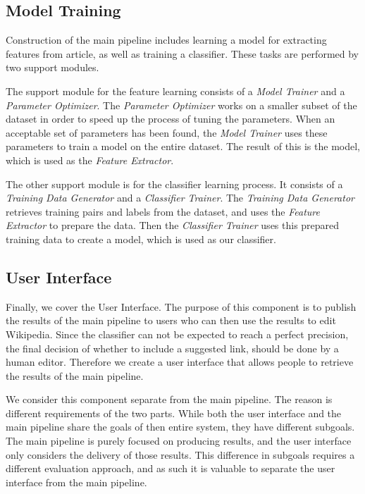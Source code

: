 \subsection{Model Training}
Construction of the main pipeline includes learning a model for extracting features from article, as well as training a classifier. These tasks are performed by two support modules.

The support module for the feature learning consists of a \emph{Model Trainer} and a \emph{Parameter Optimizer}. The \emph{Parameter Optimizer} works on a smaller subset of the dataset in order to speed up the process of tuning the parameters. When an acceptable set of parameters has been found, the \emph{Model Trainer} uses these parameters to train a model on the entire dataset. The result of this is the model, which is used as the \emph{Feature Extractor}.

The other support module is for the classifier learning process. It consists of a \emph{Training Data Generator} and a \emph{Classifier Trainer}. The \emph{Training Data Generator} retrieves training pairs and labels from the dataset, and uses the \emph{Feature Extractor} to prepare the data. Then the \emph{Classifier Trainer} uses this prepared training data to create a model, which is used as our classifier.

\subsection{User Interface}

Finally, we cover the User Interface. The purpose of this component is to publish the results of the main pipeline to users who can then use the results to edit Wikipedia. Since the classifier can not be expected to reach a perfect precision, the final decision of whether to include a suggested link, should be done by a human editor. Therefore we create a user interface that allows people to retrieve the results of the main pipeline.

We consider this component separate from the main pipeline. The reason is different requirements of the two parts. While both the user interface and the main pipeline share the goals of then entire system, they have different subgoals. The main pipeline is purely focused on producing results, and the user interface only considers the delivery of those results. This difference in subgoals requires a different evaluation approach, and as such it is valuable to separate the user interface from the main pipeline.










